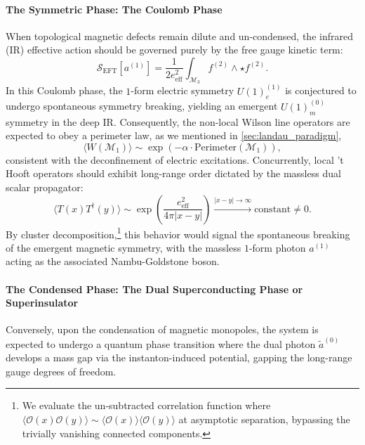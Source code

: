 \documentclass[aps,preprint,nofootinbib,preprintnumbers,eqsecnum,superscriptaddress]{revtex4}
\numberwithin{equation}{section}
\begin{document}
\paragraph*{The Symmetric Phase: The Coulomb Phase}When topological magnetic defects remain dilute and un-condensed, the infrared (IR) effective action should be governed purely by the free gauge kinetic term:
\begin{equation}
\mathcal{S}_{\text{EFT}}[a^{(1)}] = \frac{1}{2e_{\text{eff}}^2} \int_{\mathcal{M}_3} f^{(2)} \wedge \star f^{(2)}.
\end{equation}
In this Coulomb phase, the $1$-form electric symmetry $U(1)_e^{(1)}$ is conjectured to undergo spontaneous symmetry breaking, yielding an emergent $U(1)_m^{(0)}$ symmetry in the deep IR. Consequently, the non-local Wilson line operators are expected to obey a perimeter law, as we mentioned in \ref{sec:landau_paradigm},
\begin{equation}
\langle W(\mathcal{M}_1) \rangle \sim \exp\left(-\alpha \cdot \text{Perimeter}(\mathcal{M}_1)\right),
\end{equation}
consistent with the deconfinement of electric excitations. Concurrently, local 't Hooft operators should exhibit long-range order dictated by the massless dual scalar propagator:
\begin{equation}
\langle T(x) T^\dagger(y) \rangle \sim \exp\left( \frac{e_{\text{eff}}^2}{4\pi |x-y|} \right) \xrightarrow{|x-y| \to \infty} \text{constant} \neq 0.
\end{equation}
By cluster decomposition,\footnote{We evaluate the un-subtracted correlation function where $\langle \mathcal{O}(x) \mathcal{O}(y) \rangle \sim \langle \mathcal{O}(x) \rangle \langle \mathcal{O}(y) \rangle$ at asymptotic separation, bypassing the trivially vanishing connected components.} this behavior would signal the spontaneous breaking of the emergent magnetic symmetry, with the massless $1$-form photon $a^{(1)}$ acting as the associated Nambu-Goldstone boson.

\paragraph*{The Condensed Phase: The Dual Superconducting Phase or Superinsulator}
Conversely, upon the condensation of magnetic monopoles, the system is expected to undergo a quantum phase transition where the dual photon $\tilde{a}^{(0)}$ develops a mass gap via the instanton-induced potential, gapping the long-range gauge degrees of freedom.
\end{document}
